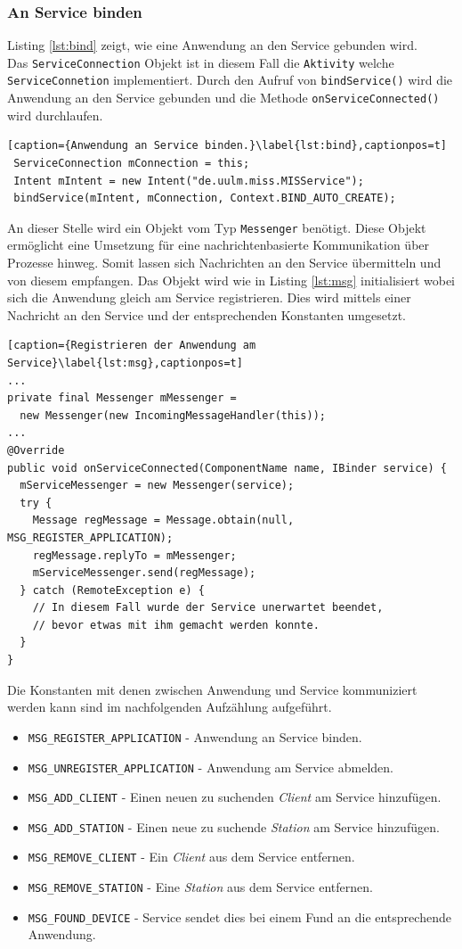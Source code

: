 \documentclass[]{report}
\begin{document}
\subsubsection{An Service binden}
Listing \ref{lst:bind}  zeigt, wie eine Anwendung an den Service gebunden wird.\\ Das \texttt{ServiceConnection} Objekt ist in diesem Fall die \texttt{Aktivity} welche \texttt{ServiceConnetion} implementiert. Durch den Aufruf von \texttt{bindService()} wird die Anwendung an den Service gebunden und die Methode \texttt{onServiceConnected()} wird durchlaufen. 
\begin{lstlisting}[caption={Anwendung an Service binden.}\label{lst:bind},captionpos=t] 
 ServiceConnection mConnection = this;
 Intent mIntent = new Intent("de.uulm.miss.MISService");
 bindService(mIntent, mConnection, Context.BIND_AUTO_CREATE);
 \end{lstlisting}
 An dieser Stelle wird ein Objekt vom Typ \texttt{Messenger} benötigt. Diese Objekt ermöglicht eine Umsetzung für eine nachrichtenbasierte Kommunikation über Prozesse hinweg. Somit lassen sich Nachrichten an den Service übermitteln und von diesem empfangen. Das Objekt wird wie in Listing \ref{lst:msg} initialisiert wobei sich die Anwendung gleich am Service registrieren. Dies wird mittels einer Nachricht an den Service und der entsprechenden Konstanten umgesetzt. 
\begin{lstlisting}[caption={Registrieren der Anwendung am Service}\label{lst:msg},captionpos=t] 
...
private final Messenger mMessenger = 
  new Messenger(new IncomingMessageHandler(this));
...
@Override
public void onServiceConnected(ComponentName name, IBinder service) {
  mServiceMessenger = new Messenger(service);
  try {
    Message regMessage = Message.obtain(null, MSG_REGISTER_APPLICATION);
    regMessage.replyTo = mMessenger;
    mServiceMessenger.send(regMessage);
  } catch (RemoteException e) {
 	// In diesem Fall wurde der Service unerwartet beendet,
 	// bevor etwas mit ihm gemacht werden konnte.
  }
}
\end{lstlisting}
 Die Konstanten mit denen zwischen Anwendung und Service kommuniziert werden kann sind im nachfolgenden Aufzählung aufgeführt.
\begin{itemize}
\item \texttt{MSG\_REGISTER\_APPLICATION} - Anwendung an Service binden.
\item \texttt{MSG\_UNREGISTER\_APPLICATION} - Anwendung am Service abmelden.
\item \texttt{MSG\_ADD\_CLIENT} - Einen neuen zu suchenden \textit{Client} am Service hinzufügen.
\item \texttt{MSG\_ADD\_STATION} - Einen neue zu suchende \textit{Station} am Service hinzufügen. 
\item \texttt{MSG\_REMOVE\_CLIENT} - Ein \textit{Client} aus dem Service entfernen.
\item \texttt{MSG\_REMOVE\_STATION} - Eine \textit{Station} aus dem Service entfernen.
\item \texttt{MSG\_FOUND\_DEVICE} - Service sendet dies bei einem Fund an die entsprechende Anwendung. 
 \end{itemize}
\end{document}
